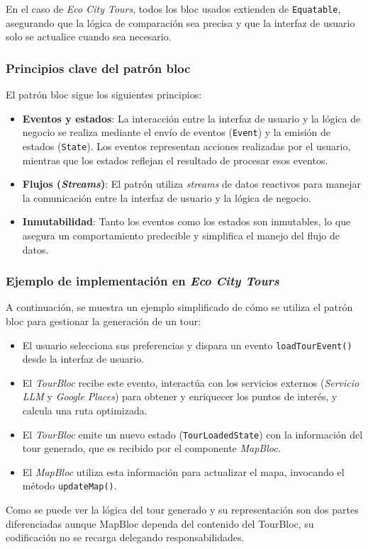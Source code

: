 En el caso de \textit{Eco City Tours}, todos los \acrshort{bloc} usados extienden de \texttt{Equatable}, asegurando que la lógica de comparación sea precisa y que la interfaz de usuario solo se actualice cuando sea necesario. 

\subsubsection{Principios clave del patrón \acrshort{bloc}}
	El patrón \acrfull{bloc} sigue los siguientes principios:
	\begin{itemize}
		\item \textbf{Eventos y estados}: La interacción entre la interfaz de usuario y la lógica de negocio se realiza mediante el envío de eventos (\texttt{Event}) y la emisión de estados (\texttt{State}). Los eventos representan acciones realizadas por el usuario, mientras que los estados reflejan el resultado de procesar esos eventos.
		\item \textbf{Flujos (\textit{Streams})}: El patrón utiliza \textit{streams} de datos reactivos para manejar la comunicación entre la interfaz de usuario y la lógica de negocio.
		\item \textbf{Inmutabilidad}: Tanto los eventos como los estados son inmutables, lo que asegura un comportamiento predecible y simplifica el manejo del flujo de datos.
	\end{itemize}
	

\subsubsection{Ejemplo de implementación en \textit{Eco City Tours}}
A continuación, se muestra un ejemplo simplificado de cómo se utiliza el patrón \acrshort{bloc} para gestionar la generación de un tour:
\begin{itemize}
	\item El usuario selecciona sus preferencias y dispara un evento \texttt{loadTourEvent()} desde la interfaz de usuario.
	\item El \textit{TourBloc} recibe este evento, interactúa con los servicios externos (\textit{Servicio LLM} y \textit{Google Places}) para obtener y enriquecer los puntos de interés, y calcula una ruta optimizada.
	\item El \textit{TourBloc} emite un nuevo estado (\texttt{TourLoadedState}) con la información del tour generado, que es recibido por el componente \textit{MapBloc}.
	\item El \textit{MapBloc} utiliza esta información para actualizar el mapa, invocando el método \texttt{updateMap()}.
\end{itemize}
Como se puede ver la lógica del tour generado y su representación son dos partes diferenciadas aunque MapBloc dependa del contenido del TourBloc, su codificación no se recarga delegando responsabilidades.

